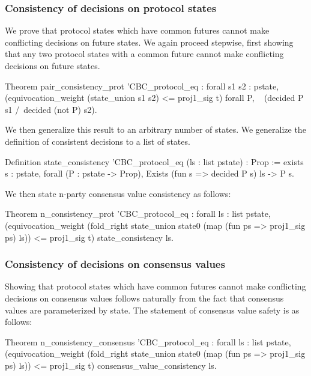 \documentclass[runningheads]{llncs}
\begin{document}
\subsubsection{Consistency of decisions on protocol states}
We prove that protocol states which have common futures cannot make conflicting decisions on future states. We again proceed stepwise, first showing that any two protocol states with a common future cannot make conflicting decisions on future states. 
\begin{coq}
Theorem pair_consistency_prot '{CBC_protocol_eq} :
	forall s1 s2 : pstate,
	(equivocation_weight (state_union s1 s2) <= proj1_sig t)%
	forall P, 
	~ (decided P s1 /\ decided (not P) s2).
\end{coq}
We then generalize this result to an arbitrary number of states. We generalize the definition of consistent decisions to a list of states. 
\begin{coq}
Definition state_consistency '{CBC_protocol_eq} (ls : list pstate) : Prop :=
exists s : pstate,
forall (P : pstate -> Prop),
Exists (fun s => decided P s) ls ->
P s.
\end{coq}
We then state n-party consensus value consistency as follows: 
\begin{coq}
Theorem n_consistency_prot '{CBC_protocol_eq} :
forall ls : list pstate,
(equivocation_weight (fold_right state_union state0 (map (fun ps => proj1_sig ps) ls)) <= proj1_sig t)%
state_consistency ls.
\end{coq}

\subsubsection{Consistency of decisions on consensus values} 
Showing that protocol states which have common futures cannot make conflicting decisions on consensus values follows naturally from the fact that consensus values are parameterized by state. The statement of consensus value safety is as follows: 
\begin{coq}
Theorem n_consistency_consensus '{CBC_protocol_eq} :
	forall ls : list pstate,
	(equivocation_weight (fold_right state_union state0 (map (fun ps => proj1_sig ps) ls)) <= proj1_sig t)%
	consensus_value_consistency ls. 
\end{coq}
\end{document}
